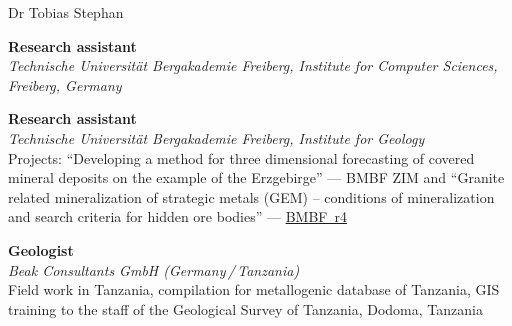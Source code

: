 \documentclass[10pt, paper=letter]{scrartcl} %
\begin{document}
\begin{cv}{\textcolor{myred}{\textsf{Dr Tobias Stephan}}}
\begin{cvlist}{}
        \item[2019/09--2019/12] \textbf{Research assistant}\\
        \textit{Technische Universit\"at Bergakademie Freiberg, Institute for Computer Sciences, Freiberg, Germany}

        \item[2014--2018] \textbf{Research assistant}\\
        \textit{Technische Universit\"at Bergakademie Freiberg, Institute for Geology}
        \\ Projects: \enquote{Developing a method for three dimensional forecasting of covered mineral deposits on the example of the Erzgebirge} --- BMBF ZIM and \enquote{Granite related mineralization of strategic metals (GEM) – conditions of mineralization and search criteria for hidden ore bodies} --- \href{https://www.gfz-potsdam.de/en/section/inorganic-and-isotope-geochemistry/projects/prohydrogen-more-mofette-research-prosalz-gramm-sugar-gem-amrep-halmahera-gogaf-irup-spp-sample-ketzin-co2-cosanostra-inkaba-yeafrica-dafgas/gem/bmbf-r4-gem}{BMBF~r4}
        \item[2014/01--2014/06] \textbf{Geologist}\\
        \textit{Beak Consultants GmbH (Germany\,/\,Tanzania)}\\
        Field work in Tanzania, compilation for metallogenic database of Tanzania, GIS training to the staff of the Geological Survey of Tanzania, Dodoma, Tanzania

\end{cvlist}
\end{cv}
\end{document}
